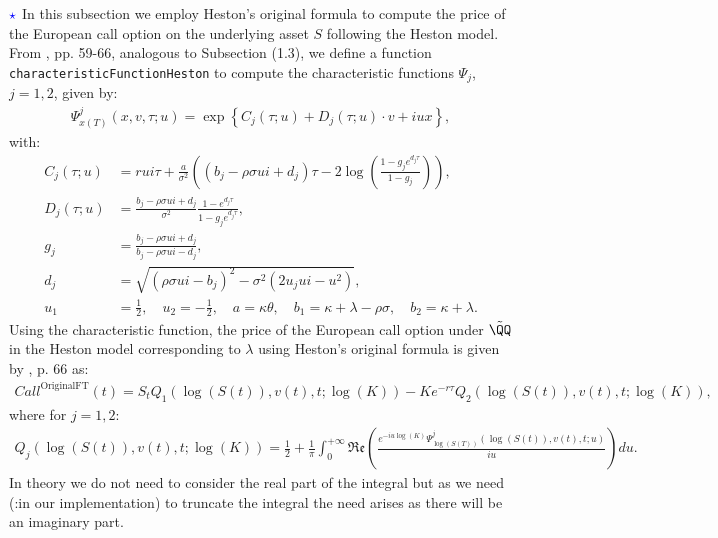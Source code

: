 \documentclass[11pt]{article}
\numberwithin{equation}{section}
\newcommand{\lc}{\left\{}
\newcommand{\rc}{\right\}}
\begin{document}
$\textcolor{blue}{\star}$ In this subsection we employ Heston's original formula
to compute the price of the European call option on the underlying asset $S$
following the Heston model. From \cite{Havrylenko2024}, pp. 59-66, analogous to
Subsection (1.3), we define a function \texttt{characteristicFunctionHeston} to compute the
characteristic functions $\Psi_j$, $j=1,2$, given by:
\begin{align*}
    \Psi_{x(T)}^j(x,v,\tau;u)=\exp \lc C_j (\tau; u) + D_j (\tau; u) \cdot v + i  u x \rc,
\end{align*}
with:
\begin{align*}
    C_j(\tau ; u) &= rui\tau + \frac{a}{\sigma^2}\left( (b_j - \rho\sigma ui + d_j) \tau - 2 \log \left( \frac{1 - g_j e^{d_j \tau}}{1 - g_j} \right) \right), \\
    D_j(\tau ; u) &= \frac{b_j - \rho \sigma ui + d_j}{\sigma^2} \frac{1 - e^{d_j \tau}}{1 - g_j e^{d_j \tau}}, \\
    g_j &= \frac{b_j - \rho\sigma ui + d_j}{b_j - \rho\sigma ui - d_j}, \\
    d_j &= \sqrt{(\rho\sigma ui - b_j)^2 - \sigma^2(2u_jui - u^2)},\\
    u_1 &= \frac{1}{2}, \quad u_2 = -\frac{1}{2}, \quad a = \kappa\theta, \quad b_1 = \kappa + \lambda - \rho\sigma, \quad b_2 = \kappa + \lambda.
\end{align*}
Using the characteristic function, the price of the European call option under
$\tilde{\QQ}$ in the Heston model corresponding to $\lambda$ using Heston's
original formula is given by \cite{Havrylenko2024}, p. 66 as:
\begin{align*}
    Call^{\text{OriginalFT}}(t)=S_tQ_1(\log(S(t)),v(t),t;\log(K))-Ke^{-r\tau}Q_2(\log(S(t)),v(t),t;\log(K)),
\end{align*}
where for $j=1,2$:
\begin{align*}
    Q_j(\log(S(t)),v(t),t;\log(K))=\frac{1}{2}+\frac{1}{\pi}\int_0^{+\infty} \mathfrak{Re} \left ( \frac{e^{-iu\log(K)}\Psi^j_{\log(S(T))}(\log(S(t)),v(t),t;u)}{iu}\right )du.
\end{align*}
In theory we do not need to consider the real part of the integral
but as we need (:in our implementation) to truncate the integral the need arises as there will be an
imaginary part. 
\end{document}
